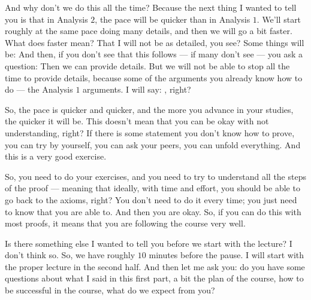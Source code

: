 \begin{spoken-clean}[00:38:15 - 00:40:10]
And why don't we do this all the time? Because the next thing I wanted to tell you is that in Analysis $2$, the pace will be quicker than in Analysis $1$. We'll start roughly at the same pace doing many details, and then we will go a bit faster. What does faster mean? That I will not be as detailed, you see? Some things will be:  And then, if you don't see that this follows --- if many don't see --- you ask a question:  Then we can provide details. But we will not be able to stop all the time to provide details, because some of the arguments you already know how to do --- the Analysis $1$ arguments. I will say: , right?

So, the pace is quicker and quicker, and the more you advance in your studies, the quicker it will be. This doesn't mean that you can be okay with not understanding, right? If there is some statement you don't know how to prove, you can try by yourself, you can ask your peers, you can unfold everything. And this is a very good exercise.

So, you need to do your exercises, and you need to try to understand all the steps of the proof --- meaning that ideally, with time and effort, you should be able to go back to the axioms, right? You don't need to do it every time; you just need to know that you are able to. And then you are okay. So, if you can do this with most proofs, it means that you are following the course very well.

Is there something else I wanted to tell you before we start with the lecture? I don't think so. So, we have roughly $10$ minutes before the pause. I will start with the proper lecture in the second half. And then let me ask you: do you have some questions about what I said in this first part, a bit the plan of the course, how to be successful in the course, what do we expect from you?


\end{spoken-clean}
